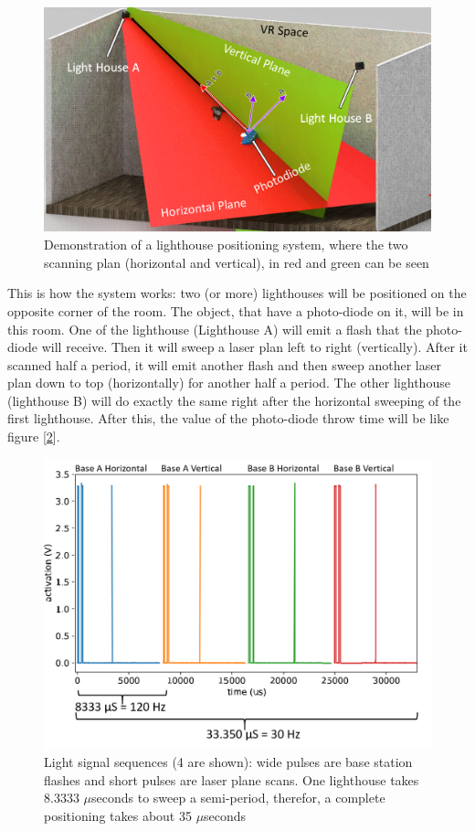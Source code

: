 \documentclass{vldb}
\begin{document}
\bigbreak
\begin{figure}
\centering
\includegraphics[width=1.0\columnwidth]{Image/LH1.png}
\caption{Demonstration of a lighthouse positioning system, where the two scanning plan (horizontal and vertical), in red and green can be seen \cite{cedric}}
\label{plage}
\end{figure}
This is how the system works: two (or more) lighthouses will be positioned on the opposite corner of the room. The object, that have a photo-diode on it, will be in this room. One of the lighthouse (Lighthouse A) will emit a flash that the photo-diode will receive. Then it will sweep a laser plan left to right (vertically). After it scanned half a period, it will emit another flash and then sweep another laser plan down to top (horizontally) for another half a period. The other lighthouse (lighthouse B) will do exactly the same right after the horizontal sweeping of the first lighthouse. After this, the value of the photo-diode throw time will be like figure [\ref{photo}].
\begin{figure}
\centering
\includegraphics[width=1.0\columnwidth]{Image/Signal2.png}
\caption{Light signal sequences (4 are shown): wide pulses are base station flashes and short pulses are laser plane scans. One lighthouse takes 8.3333 $\mu$seconds to sweep a semi-period, therefor, a complete positioning takes about 35 $\mu$seconds \cite{cedric}}
\label{photo}
\end{figure}
\end{document}
